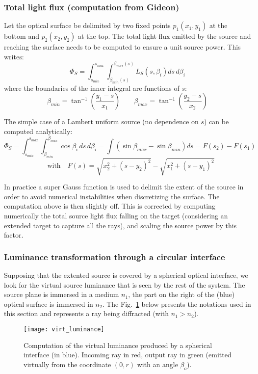 \subsubsection*{Total light flux (computation from Gideon)}
Let the optical surface be delimited by two fixed 
points $p_1(x_1, y_1)$ at the bottom and $p_2(x_2, y_2)$ at the top.
The total light flux emitted by the source and reaching the surface needs
to be computed to ensure a unit source power.
This writes:
\begin{equation}
\label{eq:power_scale}
 \Phi_S  
= \int_{s_{min}}^{s_{max}} \int_{\beta_{min}(s)}^{\beta_{max}(s)} 
     L_S(s,\beta_i)ds\,d\beta_i
\end{equation}
where the boundaries of the inner integral are functions of $s$:
\[ \beta_{min} = \tan^{-1}\left(\frac{y_1-s}{x_1}\right) \quad\quad 
   \beta_{max} = \tan^{-1}\left(\frac{y_2-s}{x_2}\right)\]

The simple case of a Lambert uniform source (no dependence on $s$) can be computed 
analytically:
\[ \Phi_S  
= \int_{s_{min}}^{s_{max}} \int_{\beta_{min}}^{\beta_{max}} 
      \cos\beta_i\,ds\,d\beta_i = \int (\sin\beta_{max} - \sin\beta_{min})ds
 = F(s_2) - F(s_1)
    \]
\[  \quad\text{with}\quad
  F(s) = \sqrt{x_2^2  + (s-y_2)^2} - \sqrt{x_1^2  + (s-y_1)^2} \]

In practice a super Gauss function is used to delimit the extent of the source
in order to avoid numerical instabilities when discretizing the surface.
The computation above is then slightly off. This is corrected by computing
numerically the total source light flux falling on the target (considering
an extended target to capture all the rays), and scaling the source power
by this factor.

\subsubsection*{Luminance transformation through a circular interface}
Supposing that the extented source is covered by a spherical optical interface,
we look for the virtual source luminance that is seen by the rest of the 
system. The source plane is immersed in a medium $n_1$, the part on the right
of the (blue) optical surface is immersed in $n_2$.
The Fig.~\ref{fig:virt_lum} below presents the notations used in this section and
represents a ray being diffracted (with $n_1 > n_2$).

\begin{figure}[!htbp]
\centering
\texttt{[image: virt\_luminance]} 
\caption{Computation of the virtual luminance produced by a spherical interface (in blue).
Incoming ray in red, output ray in green (emitted virtually from the coordinate $(0, r)$
with an angle $\beta_o$).}
\label{fig:virt_lum}
\end{figure}

